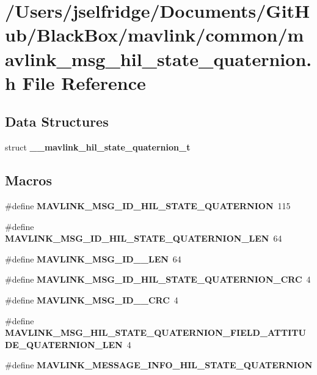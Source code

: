 \section{/\+Users/jselfridge/\+Documents/\+Git\+Hub/\+Black\+Box/mavlink/common/mavlink\+\_\+msg\+\_\+hil\+\_\+state\+\_\+quaternion.h File Reference}
\label{mavlink__msg__hil__state__quaternion_8h}
\subsection*{Data Structures}
\begin{DoxyCompactItemize}
\item 
struct \textbf{ \+\_\+\+\_\+mavlink\+\_\+hil\+\_\+state\+\_\+quaternion\+\_\+t}
\end{DoxyCompactItemize}
\subsection*{Macros}
\begin{DoxyCompactItemize}
\item 
\#define \textbf{ M\+A\+V\+L\+I\+N\+K\+\_\+\+M\+S\+G\+\_\+\+I\+D\+\_\+\+H\+I\+L\+\_\+\+S\+T\+A\+T\+E\+\_\+\+Q\+U\+A\+T\+E\+R\+N\+I\+ON}~115
\item 
\#define \textbf{ M\+A\+V\+L\+I\+N\+K\+\_\+\+M\+S\+G\+\_\+\+I\+D\+\_\+\+H\+I\+L\+\_\+\+S\+T\+A\+T\+E\+\_\+\+Q\+U\+A\+T\+E\+R\+N\+I\+O\+N\+\_\+\+L\+EN}~64
\item 
\#define \textbf{ M\+A\+V\+L\+I\+N\+K\+\_\+\+M\+S\+G\+\_\+\+I\+D\+\_\+\_\+\+L\+EN}~64
\item 
\#define \textbf{ M\+A\+V\+L\+I\+N\+K\+\_\+\+M\+S\+G\+\_\+\+I\+D\+\_\+\+H\+I\+L\+\_\+\+S\+T\+A\+T\+E\+\_\+\+Q\+U\+A\+T\+E\+R\+N\+I\+O\+N\+\_\+\+C\+RC}~4
\item 
\#define \textbf{ M\+A\+V\+L\+I\+N\+K\+\_\+\+M\+S\+G\+\_\+\+I\+D\+\_\+\_\+\+C\+RC}~4
\item 
\#define \textbf{ M\+A\+V\+L\+I\+N\+K\+\_\+\+M\+S\+G\+\_\+\+H\+I\+L\+\_\+\+S\+T\+A\+T\+E\+\_\+\+Q\+U\+A\+T\+E\+R\+N\+I\+O\+N\+\_\+\+F\+I\+E\+L\+D\+\_\+\+A\+T\+T\+I\+T\+U\+D\+E\+\_\+\+Q\+U\+A\+T\+E\+R\+N\+I\+O\+N\+\_\+\+L\+EN}~4
\item 
\#define \textbf{ M\+A\+V\+L\+I\+N\+K\+\_\+\+M\+E\+S\+S\+A\+G\+E\+\_\+\+I\+N\+F\+O\+\_\+\+H\+I\+L\+\_\+\+S\+T\+A\+T\+E\+\_\+\+Q\+U\+A\+T\+E\+R\+N\+I\+ON}
\end{DoxyCompactItemize}
